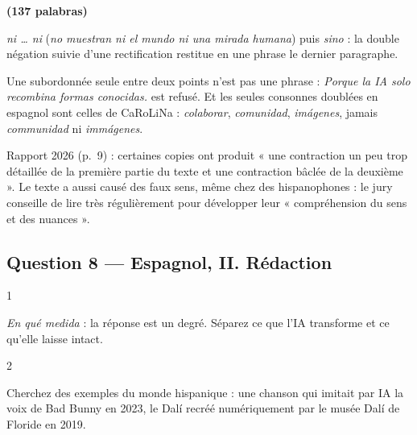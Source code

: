 \documentclass[11pt,a4paper]{article}
\begin{document}
\textbf{(137 palabras)}

\begin{methode}

\emph{ni \ldots{} ni} (\emph{no muestran ni el mundo ni una mirada humana}) puis \emph{sino} : la double négation suivie d'une rectification restitue en une phrase le dernier paragraphe.

\end{methode}

\begin{piege}

Une subordonnée seule entre deux points n'est pas une phrase : \emph{Porque la IA solo recombina formas conocidas.} est refusé. Et les seules consonnes doublées en espagnol sont celles de CaRoLiNa : \emph{colaborar}, \emph{comunidad}, \emph{imágenes}, jamais \emph{communidad} ni \emph{immágenes}.

\end{piege}

\begin{jury}

Rapport 2026 (p.~9) : certaines copies ont produit « une contraction un peu trop détaillée de la première partie du texte et une contraction bâclée de la deuxième ». Le texte a aussi causé des faux sens, même chez des hispanophones : le jury conseille de lire très régulièrement pour développer leur « compréhension du sens et des nuances ».

\end{jury}

\hypertarget{question-8-espagnol-ii.-ruxe9daction}{%
\subsection{Question 8 --- Espagnol, II. Rédaction}\label{question-8-espagnol-ii.-ruxe9daction}}

\begin{indication}{1}

\emph{En qué medida} : la réponse est un degré. Séparez ce que l'IA transforme et ce qu'elle laisse intact.

\end{indication}

\begin{indication}{2}

Cherchez des exemples du monde hispanique : une chanson qui imitait par IA la voix de Bad Bunny en 2023, le Dalí recréé numériquement par le musée Dalí de Floride en 2019.

\end{indication}
\end{document}
